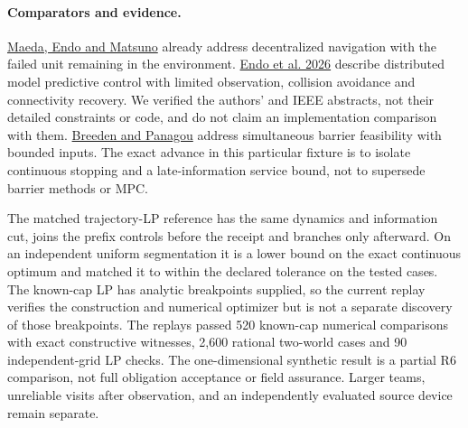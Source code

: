 \documentclass{article}
\begin{document}
\paragraph{Comparators and evidence.}
\href{https://www.sciencedirect.com/science/article/pii/S0016003223003046}{Maeda, Endo and Matsuno} already address decentralized navigation with the failed unit remaining in the environment. \href{https://en.endo-lab.jp/publication/detail/12147}{Endo et al. 2026} describe distributed model predictive control with limited observation, collision avoidance and connectivity recovery. We verified the authors' and IEEE abstracts, not their detailed constraints or code, and do not claim an implementation comparison with them. \href{https://arxiv.org/abs/2210.01354}{Breeden and Panagou} address simultaneous barrier feasibility with bounded inputs. The exact advance in this particular fixture is to isolate continuous stopping and a late-information service bound, not to supersede barrier methods or MPC.

The matched trajectory-LP reference has the same dynamics and information cut, joins the prefix controls before the receipt and branches only afterward. On an independent uniform segmentation it is a lower bound on the exact continuous optimum and matched it to within the declared tolerance on the tested cases. The known-cap LP has analytic breakpoints supplied, so the current replay verifies the construction and numerical optimizer but is not a separate discovery of those breakpoints. The replays passed 520 known-cap numerical comparisons with exact constructive witnesses, 2,600 rational two-world cases and 90 independent-grid LP checks. The one-dimensional synthetic result is a partial R6 comparison, not full obligation acceptance or field assurance. Larger teams, unreliable visits after observation, and an independently evaluated source device remain separate.
\end{document}
